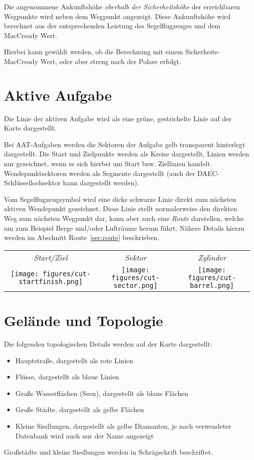 Die angenommene Ankunftshöhe {\em oberhalb der Sicherheitshöhe} der erreichbaren  Wegpunkte wird neben dem Wegpunkt  angezeigt. Diese Ankunftshöhe wird berechnet aus der entsprechenden Leistung des Segelflugzeuges und dem MacCready Wert. 

 Hierbei kann gewählt werden, ob die Berechnung mit einem Sicherheits-MacCready Wert, oder aber streng nach der Polare erfolgt.
\section{Aktive Aufgabe}

Die Linie der aktiven Aufgabe wird als eine grüne, gestrichelte Linie auf der Karte dargestellt.

Bei AAT-Aufgaben werden die Sektoren der Aufgabe gelb transparent hinterlegt dargestellt.
Die Start und Zielpunkte werden als Kreise dargestellt, Linien werden nur 
gezeichnet, wenn es sich hierbei um Start bzw. Ziellinien handelt.
Wendepunktsektoren werden als Segmente dargestellt (auch der DAEC-Schlüssellochsektor kann dargestellt werden).


Vom Segelflugzeugsymbol wird eine dicke schwarze Linie direkt zum nächsten aktiven Wendepunkt gezeichnet. Diese Linie stellt normalerweise den direkten Weg zum nächsten Wegpunkt dar, kann aber auch eine {\em Route} darstellen, welche um zum Beispiel Berge und/oder Lufträume herum führt. Nähere Details hierzu werden im Abschnitt Route~\ref{sec:route}  beschrieben.
\begin{center}
\begin{tabular}{c c c}
{\it Start/Ziel} & {\it Sektor} & {\it Zylinder} \\
\texttt{[image: figures/cut-startfinish.png]} &
\texttt{[image: figures/cut-sector.png]} &
\texttt{[image: figures/cut-barrel.png]} \\
\end{tabular}
\end{center}
\section{Gelände und Topologie}

Die folgenden topologischen Details werden auf der Karte dargestellt:
\begin{itemize}
\item Hauptstraße, dargestellt als rote Linien
\item Flüsse, dargestellt als blaue Linien
\item Große Wasserflächen (Seen), dargestellt als blaue Flächen
\item Große Städte, dargestellt als gelbe Flächen
\item Kleine Siedlungen, dargestellt als gelbe Diamanten, je nach verwendeter Datenbank wird auch nur der Name angezeigt 
\end{itemize}
Großstädte und kleine Siedlungen werden in Schrägschrift beschriftet.

